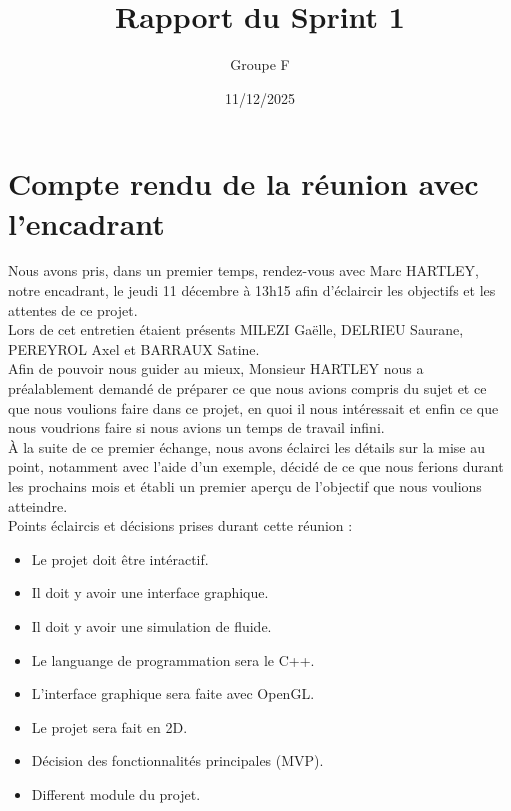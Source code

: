 \documentclass{article}
\title{Rapport du Sprint 1}
\date{11/12/2025}
\author{Groupe F}
\begin{document}
	\maketitle	

   \section{Compte rendu de la réunion avec l'encadrant}

   Nous avons pris, dans un premier temps, rendez-vous avec Marc HARTLEY, notre encadrant, 
   le jeudi 11 décembre à 13h15 afin d'éclaircir les objectifs et les attentes de ce projet.\\
   Lors de cet entretien étaient présents MILEZI Gaëlle, DELRIEU Saurane, PEREYROL Axel et BARRAUX Satine. \\
   Afin de pouvoir nous guider au mieux, Monsieur HARTLEY nous a préalablement demandé de 
   préparer ce que nous avions compris du sujet et ce que nous voulions faire dans ce projet, 
   en quoi il nous intéressait et enfin ce que nous voudrions faire si nous avions un temps de travail infini.\\
   À la suite de ce premier échange, nous avons éclairci les détails sur la mise au point, notamment avec l'aide d'un
   exemple, décidé de ce que nous ferions durant les prochains mois et établi un premier aperçu de l'objectif que nous
   voulions atteindre.\\
   Points éclaircis et décisions prises durant cette réunion :
   \begin{itemize}
      \item Le projet doit être intéractif.
      \item Il doit y avoir une interface graphique.
      \item Il doit y avoir une simulation de fluide.
      \item Le languange de programmation sera le C++.
      \item L'interface graphique sera faite avec OpenGL.
      \item Le projet sera fait en 2D.
      \item Décision des fonctionnalités principales (MVP).
      \item Different module du projet.
   \end{itemize}
   
\end{document}

